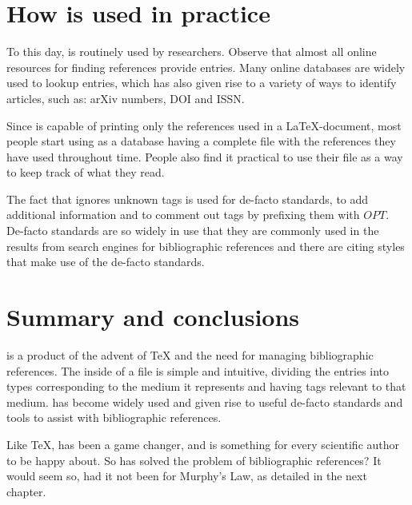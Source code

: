 \section{How {\bibtex} is used in practice}
\label{sec:how_bibtex_is_used_today}

To this day, {\bibtex} is routinely used by researchers.  Observe that
almost all online resources for finding references provide {\bibtex}
entries.  Many online databases are widely used to lookup entries,
which has also given rise to a variety of ways to identify articles,
such as: arXiv numbers, DOI and ISSN.

Since {\bibtex} is capable of printing only the references used in a
{\LaTeX}-document, most people start using {\bibtex} as a database
having a complete file with the references they have used throughout
time.  People also find it practical to use their {\bibtex} file as a
way to keep track of what they read.

The fact that {\bibtex} ignores unknown tags is used for de-facto standards, to
add additional information and to comment out tags by prefixing them
with $OPT$.  De-facto standards are so widely in use that they are
commonly used in the results from search engines for bibliographic
references and there are citing styles that make use of the de-facto
standards.


\section{Summary and conclusions}
\label{sec:about_conclusion}


{\bibtex} is a product of the advent of {\TeX} and the need for
managing bibliographic references.  The inside of a {\bibtex} file is
simple and intuitive, dividing the entries into types corresponding
to the medium it represents and having tags relevant to that medium.
{\bibtex} has become widely used and given rise to useful de-facto
standards and tools to assist with bibliographic references.

Like {\TeX}, {\bibtex} has been a game changer, and is something for
every scientific author to be happy about.  So has {\bibtex} solved the
problem of bibliographic references? It would seem so, had it not been
for Murphy's Law, as detailed in the next chapter.


%
